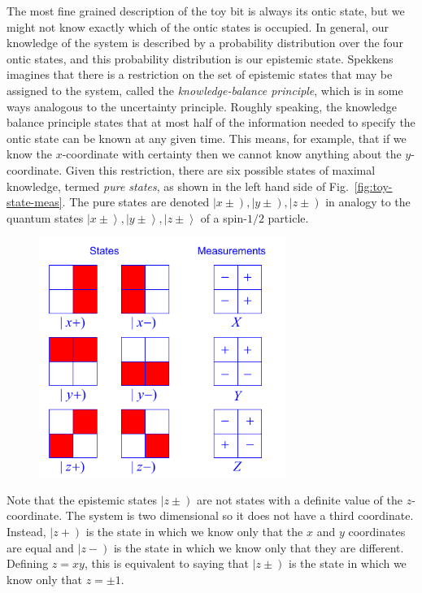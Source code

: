 \documentclass[DIV=calc,fontsize=12pt]{scrartcl} %
\theoremstyle{definition}
\theoremstyle{plain}
\newcommand{\RKet}[1]{\ensuremath{\left \vert #1 \right )}}
\newcommand{\Ket}[1]{\ensuremath{\left \vert #1 \right \rangle}}
\begin{document}
The most fine grained description of the toy bit is always its ontic
state, but we might not know exactly which of the ontic states is
occupied.  In general, our knowledge of the system is described by a
probability distribution over the four ontic states, and this
probability distribution is our epistemic state.  Spekkens imagines
that there is a restriction on the set of epistemic states that may be
assigned to the system, called the \emph{knowledge-balance principle},
which is in some ways analogous to the uncertainty principle.  Roughly
speaking, the knowledge balance principle states that at most half of
the information needed to specify the ontic state can be known at any
given time.  This means, for example, that if we know the
$x$-coordinate with certainty then we cannot know anything about the
$y$-coordinate.  Given this restriction, there are six possible states
of maximal knowledge, termed \emph{pure states}, as shown in the left
hand side of Fig.~\ref{fig:toy-state-meas}.  The pure states are
denoted $\RKet{x \pm}, \RKet{y \pm}, \RKet{z \pm}$ in analogy to the
quantum states $\Ket{x \pm}, \Ket{y \pm}, \Ket{z \pm}$ of a spin-$1/2$
particle.
\begin{figure}[t!]
\centering
\includegraphics[width=80mm]{Fig3.pdf}
\caption{}
\end{figure}
Note that the epistemic states $\RKet{z \pm}$ are not states with a
definite value of the $z$-coordinate.  The system is two dimensional
so it does not have a third coordinate.  Instead, $\RKet{z+}$ is the
state in which we know only that the $x$ and $y$ coordinates are equal
and $\RKet{z-}$ is the state in which we know only that they are
different.  Defining $z=xy$, this is equivalent to saying that
$\RKet{z \pm}$ is the state in which we know only that $z = \pm 1$.
\end{document}
